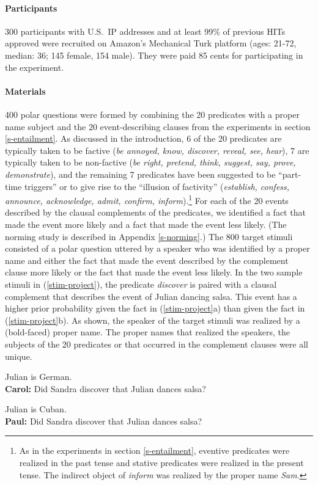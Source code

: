\documentclass[11pt,fleqn]{article}
\newcommand{\6}{\mbox{$[\hspace*{-.6mm}[$}}
\newcommand{\9}{\mbox{$]\hspace*{-.6mm}]$}}
\begin{document}
\paragraph{Participants} 300 participants with U.S.\ IP addresses and at least 99\% of previous HITs approved were recruited on Amazon's Mechanical Turk platform (ages: 21-72, median: 36; 145 female, 154 male). They were paid 85 cents for participating in the experiment.

\paragraph{Materials} 400 polar questions were formed by combining the 20 predicates with a proper name subject and the 20 event-describing clauses from the experiments in section \ref{s-entailment}. As discussed in the introduction, 6 of the 20 predicates are typically taken to be factive ({\em be annoyed, know, discover, reveal, see, hear}), 7 are typically taken to be non-factive ({\em be right, pretend, think, suggest, say, prove, demonstrate}), and the remaining 7 predicates have been suggested to be ``part-time triggers'' or to give rise to the ``illusion of factivity'' ({\em establish,  confess, announce, acknowledge, admit, confirm, inform}).\footnote{As in the experiments in section \ref{s-entailment}, eventive predicates were realized in the past tense and stative predicates were realized in the present tense. The indirect object of {\em inform} was realized by the proper name {\em Sam}.} For each of the 20 events described by the clausal complements of the predicates, we identified a fact that made the event more likely and a fact that made the event less likely. (The norming study is described in Appendix \ref{s-norming}.) The 800 target stimuli consisted of a polar question uttered by a speaker who was identified by a proper name and either the fact that made the event described by the complement clause more likely or the fact that made the event less likely. In the two sample stimuli in (\ref{stim-project}), the predicate {\em discover} is paired with a clausal complement that describes the event of Julian dancing salsa. This event has a higher prior probability given the fact in (\ref{stim-project}a) than given the fact in (\ref{stim-project}b). As shown, the speaker of the target stimuli was realized by a (bold-faced) proper name. The proper names that realized the speakers, the subjects of the 20 predicates or that occurred in the complement clauses were all unique. 

\begin{exe}
\ex\label{stim-project} 
\begin{xlist}
 Julian is German.  \\ 
{\bf Carol:} Did Sandra discover that Julian dances salsa?

 Julian is Cuban.  \\ 
{\bf Paul:} Did Sandra discover that Julian dances salsa?
\end{xlist}
\end{exe}
\end{document}
